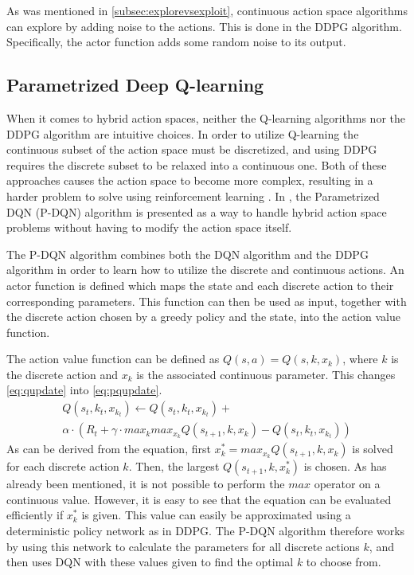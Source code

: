 \documentclass{kththesis}
\begin{document}
As was mentioned in \autoref{subsec:explorevsexploit}, continuous action space algorithms can explore by adding noise to the actions. This is done in the DDPG algorithm. Specifically, the actor function adds some random noise to its output. \parencite{lillicrap2015continuous}

\subsection{Parametrized Deep Q-learning}
When it comes to hybrid action spaces, neither the Q-learning algorithms nor the DDPG algorithm are intuitive choices. In order to utilize Q-learning the continuous subset of the action space must be discretized, and using DDPG requires the discrete subset to be relaxed into a continuous one. Both of these approaches causes the action space to become more complex, resulting in a harder problem to solve using reinforcement learning \parencite{xiong2018parametrized}. In \parencite{xiong2018parametrized}, the Parametrized DQN (P-DQN) algorithm is presented as a way to handle hybrid action space problems without having to modify the action space itself.

The P-DQN algorithm combines both the DQN algorithm and the DDPG algorithm in order to learn how to utilize the discrete and continuous actions. An actor function is defined which maps the state and each discrete action to their corresponding parameters. This function can then be used as input, together with the discrete action chosen by a greedy policy and the state, into the action value function. 

The action value function can be defined as $Q(s, a) = Q(s, k, x_k)$, where $k$ is the discrete action and $x_k$ is the associated continuous parameter. This changes \autoref{eq:qupdate} into \autoref{eq:pqupdate}. 
\begin{equation}
\label{eq:pqupdate}
\begin{split}
Q(s_t, k_t, x_{k_t}) \leftarrow Q(s_t, k_t, x_{k_t}) + \\ \alpha \cdot (R_t + \gamma \cdot max_k max_{x_k} Q(s_{t+1}, k, x_k) - Q(s_t, k_t, x_{k_t}))
\end{split}
\end{equation}
As can be derived from the equation, first $x_k^* = max_{x_k}Q(s_{t+1}, k, x_k)$ is solved for each discrete action $k$. Then, the largest $Q(s_{t+1}, k, x_k^*)$ is chosen. As has already been mentioned, it is not possible to perform the $max$ operator on a continuous value. However, it is easy to see that the equation can be evaluated efficiently if $x_k^*$ is given. This value can easily be approximated using a deterministic policy network as in DDPG. The P-DQN algorithm therefore works by using this network to calculate the parameters for all discrete actions $k$, and then uses DQN with these values given to find the optimal $k$ to choose from. \parencite{xiong2018parametrized}
\end{document}
